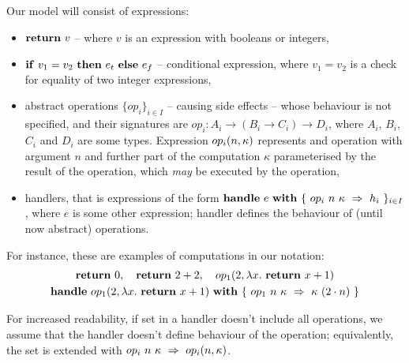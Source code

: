 Our model will consist of expressions:
\begin{itemize}
\item \(\mathbf{return}\ v\) -- where \(v\) is an expression with booleans or integers,
\item \(\mathbf{if}\ v_1 = v_2\ \mathbf{then}\ e_t\ \mathbf{else}\ e_f\) -- conditional expression, where \(v_1 = v_2\) is a check for equality of two integer expressions,
\item abstract operations \(\{op_i\}_{i \in I}\) -- causing side effects -- whose behaviour is not specified, and their signatures are \(op_i: A_i \rightarrow (B_i \rightarrow C_i) \rightarrow D_i\), where \(A_i\), \(B_i\), \(C_i\) and \(D_i\) are some types. Expression \(op_{i}(n, \kappa)\) represents and operation with argument \(n\) and further part of the computation \(\kappa\) parameterised by the result of the operation, which \textit{may} be executed by the operation,
\item handlers, that is expressions of the form \(\mathbf{handle}\ e\ \mathbf{with}\ \{\ op_i\ n\ \kappa\ \Rightarrow\ h_i\ \}_{i \in I}\), where \(e\) is some other expression; handler defines the behaviour of (until now abstract) operations.
\end{itemize}

For instance, these are examples of computations in our notation:
\begin{equation}
\begin{gathered}
  \return{0},\quad\return{2 + 2},\quad \opi{1}{2}{\fun{x}{\return{x + 1}}} \\
  \handle{\opi{1}{2}{\fun{x}{\return{x + 1}}}}{\{\ \hcase{op_1}{n\ \kappa}{\kappa\ (2 \cdot n)} \ \}}
\end{gathered}
\end{equation}

For increased readability, if set in a handler doesn't include all operations, we assume that the handler doesn't define behaviour of the operation; equivalently, the set is extended with \(op_i\ n\ \kappa\ \Rightarrow\ op_i(n, \kappa)\).

